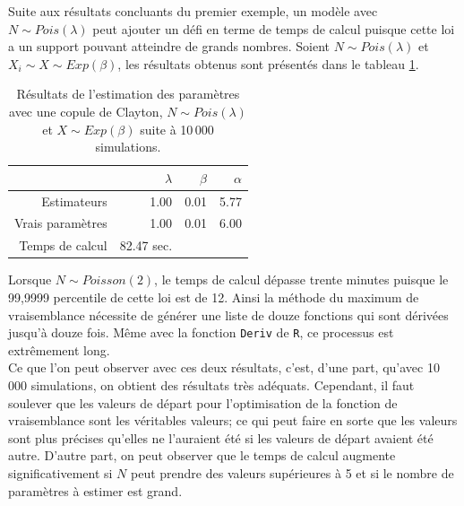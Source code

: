 \documentclass{article}
\begin{document}
	Suite aux résultats concluants du premier exemple, un modèle avec $N \sim Pois(\lambda)$ peut ajouter un défi en terme de temps de calcul puisque cette loi a un support pouvant atteindre de grands nombres. Soient $N \sim Pois(\lambda)$ et $X_i \sim X \sim Exp(\beta)$, les résultats obtenus sont présentés dans le tableau \ref{tbl_Clayton_Poisson}.
	
	\begin{table}[H]
		\centering
		\begin{tabular}{rrrr}
			\hline
			& $\lambda$ & $\beta$ & $\alpha$ \\ 
			\hline
			Estimateurs & 1.00 & 0.01 & 5.77 \\ 
			Vrais paramètres & 1.00 & 0.01 & 6.00 \\ 
			\hline
			Temps de calcul & 82.47 sec.\\
			\hline
		\end{tabular}
		\renewcommand{\tablename}{Tableau}
		\caption[Estimations avec une copule de Clayton et $N\sim Poisson$]{Résultats de l'estimation des paramètres avec une copule de Clayton, $N\sim Pois(\lambda)$ et $X \sim Exp(\beta)$ suite à 10\,000 simulations.}\label{tbl_Clayton_Poisson}
	\end{table}

	Lorsque $N \sim Poisson(2)$, le temps de calcul dépasse trente minutes puisque le 99,9999 percentile de cette loi est de 12. Ainsi la méthode du maximum de vraisemblance nécessite de générer une liste de douze fonctions qui sont dérivées jusqu'à douze fois. Même avec la fonction \texttt{Deriv} de \texttt{R}, ce processus est extrêmement long.\\
		
	Ce que l'on peut observer avec ces deux résultats, c'est, d'une part, qu'avec 10\,000 simulations, on obtient des résultats très adéquats. Cependant, il faut soulever que les valeurs de départ pour l'optimisation de la fonction de vraisemblance sont les véritables valeurs; ce qui peut faire en sorte que les valeurs sont plus précises qu'elles ne l'auraient été si les valeurs de départ avaient été autre. D'autre part, on peut observer que le temps de calcul augmente significativement si $N$ peut prendre des valeurs supérieures à 5 et si le nombre de paramètres à estimer est grand.
\end{document}
